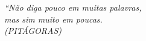 \begin{epigrafe}
    \vspace*{\fill}
	\begin{flushright}
		\textit{``Não diga pouco em muitas palavras,  \\
		mas sim muito em poucas. \\
		(PITÁGORAS)}
	\end{flushright}
\end{epigrafe}
